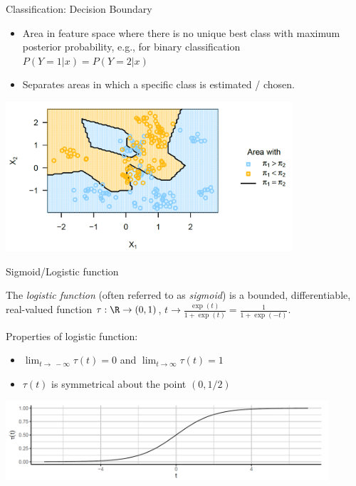 \begin{frame}{Classification: Decision Boundary}

\begin{itemize}
\item
  Area in feature space where there is no unique best class with maximum
  posterior probability, e.g., for binary classification
  \(   P(Y = 1 | x)=   P(Y = 2 | x) \)
\item
  Separates areas in which a specific class is estimated / chosen.
\end{itemize}

\scriptsize
\begin{center}
\includegraphics[width=0.8\textwidth]{plots/decision-boundary.png}
\end{center}

\normalsize 

\end{frame}


\begin{frame}{Sigmoid/Logistic function}

 
The \emph{logistic function} (often referred to as \emph{sigmoid}) is a bounded, differentiable, real-valued function $\tau: \R \to (0,1)$, $t \to \frac{\exp(t)}{1+\exp(t)}=\frac{1}{{1+\exp(-t)}}$.
\lz

Properties of logistic function:
\begin{itemize}
\item $\lim_{t \to\ -\infty} \tau(t) = 0$ and  $\lim_{t \to \infty} \tau(t) = 1$
\item $\tau(t)$ is symmetrical about the point $(0, 1/2)$
\end{itemize}

\begin{center}
\includegraphics[width=0.9\textwidth]{plots/sigmoid.png}
\end{center}

\end{frame}

